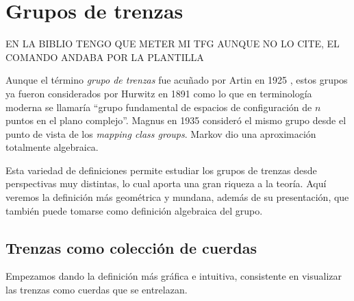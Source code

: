 \documentclass[bibtex, anon]{TEMat-article}
\begin{document}
\section{Grupos de trenzas}

EN LA BIBLIO TENGO QUE METER MI TFG AUNQUE NO LO CITE, EL COMANDO ANDABA POR LA PLANTILLA

Aunque el término \emph{grupo de trenzas} fue acuñado por Artin en 1925 \cite{ArtinA}, estos grupos ya fueron considerados por Hurwitz en 1891 \cite{Hur} como lo que en terminología moderna se llamaría ``grupo fundamental de espacios de configuración de $n$ puntos en el plano complejo''. Magnus en 1935 \cite{Magnus} consideró el mismo grupo desde el punto de vista de los \emph{mapping class groups}. Markov \cite{Markoff} dio una aproximación totalmente algebraica. 

 Esta variedad de definiciones permite estudiar los grupos de trenzas desde perspectivas muy distintas, lo cual aporta una gran riqueza a la teoría. Aquí veremos la definición más geométrica y mundana, además de su presentación, que también puede tomarse como definición algebraica del grupo.
 
 \subsection{Trenzas como colección de cuerdas}
 Empezamos dando la definición más gráfica e intuitiva, consistente en visualizar las trenzas como cuerdas que se entrelazan. 
 
\end{document}
